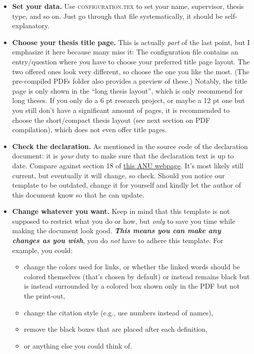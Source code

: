 \begin{itemize}
  \item \textbf{Set your data.} Use \textsc{configuration.tex} to set your name, supervisor, thesis type, and so on. Just go through that file systematically, it should be self-explanatory.
  \item \textbf{Choose your thesis title page.} This is actually \emph{part} of the last point, but I emphasize it here because many miss it: The configuration file contains an entry/question where you have to choose your preferred title page layout. The two offered ones look very different, so choose the one you like the most. (The pre-compiled PDFs folder also provides a preview of these.) Notably, the title page is only shown in the ``long thesis layout'', which is only recommend for long theses. If you only do a 6 pt research project, or maybe a 12 pt one but you still don't have a significant amount of pages, it is recommended to choose the short/compact thesis layout (see next section on PDF compilation), which does not even offer title pages.
  \item \textbf{Check the declaration.} As mentioned in the source code of the declaration document: it is \emph{your} duty to make sure that the declaration text is up to date. Compare against section 18 of \href{https://policies.anu.edu.au/ppl/document/ANUP_004603}{this ANU webpage}. It's most likely still current, but eventually it will change, so check. Should you notice our template to be outdated, change it for yourself and kindly let the author of this document know so that he can update.
  \item \textbf{Change whatever you want.} Keep in mind that this template is not supposed to restrict what you do or how, but \emph{only} to save you time while making the document look good. \textbf{\emph{This means you can make any changes as you wish}}, you do \emph{not} have to adhere this template. For example, you could:
  \begin{itemize}
    \item change the colors used for links, or whether the linked words should be colored themselves (that's chosen by default) or instead remains black but is instead surrounded by a colored box shown only in the PDF but not the print-out,
    \item change the citation style (e.g., use numbers instead of names),
    \item remove the black boxes that are placed after each definition,
    \item or anything else you could think of.

\end{itemize}
\end{itemize}
